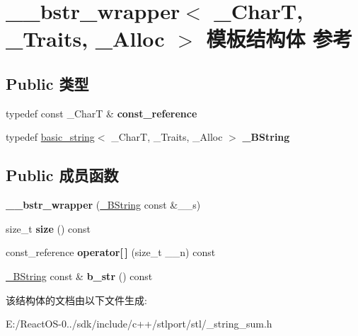 \hypertarget{struct____bstr__wrapper}{}\section{\+\_\+\+\_\+bstr\+\_\+wrapper$<$ \+\_\+\+CharT, \+\_\+\+Traits, \+\_\+\+Alloc $>$ 模板结构体 参考}
\label{struct____bstr__wrapper}
\subsection*{Public 类型}
\begin{DoxyCompactItemize}
\item 
\mbox{\label{struct____bstr__wrapper_adf9795582ffba3393cd9c2e4b47bd201}} 
typedef const \+\_\+\+CharT \& {\bfseries const\+\_\+reference}
\item 
\mbox{\label{struct____bstr__wrapper_a796565376dfcf32e0ee24556876eae51}} 
typedef \hyperlink{classbasic__string}{basic\+\_\+string}$<$ \+\_\+\+CharT, \+\_\+\+Traits, \+\_\+\+Alloc $>$ {\bfseries \+\_\+\+B\+String}
\end{DoxyCompactItemize}
\subsection*{Public 成员函数}
\begin{DoxyCompactItemize}
\item 
\mbox{\label{struct____bstr__wrapper_a38521df8319a109fb8a78ab992c4a93b}} 
{\bfseries \+\_\+\+\_\+bstr\+\_\+wrapper} (\hyperlink{classbasic__string}{\+\_\+\+B\+String} const \&\+\_\+\+\_\+s)
\item 
\mbox{\label{struct____bstr__wrapper_aac01e1752a0675c970de92bfe6807826}} 
size\+\_\+t {\bfseries size} () const
\item 
\mbox{\label{struct____bstr__wrapper_af738464a6d7baf3e4f58054613cbc599}} 
const\+\_\+reference {\bfseries operator\mbox{[}$\,$\mbox{]}} (size\+\_\+t \+\_\+\+\_\+n) const
\item 
\mbox{\label{struct____bstr__wrapper_a278dfffd164bfb95da2540c2766a1112}} 
\hyperlink{classbasic__string}{\+\_\+\+B\+String} const  \& {\bfseries b\+\_\+str} () const
\end{DoxyCompactItemize}


该结构体的文档由以下文件生成\+:\begin{DoxyCompactItemize}
\item 
E\+:/\+React\+O\+S-\/0../sdk/include/c++/stlport/stl/\+\_\+string\+\_\+sum.\+h\end{DoxyCompactItemize}
